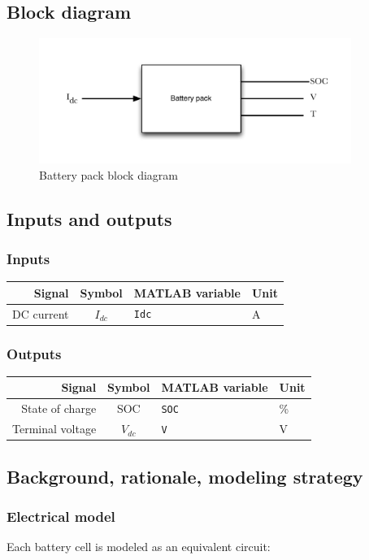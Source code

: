 \documentclass[../SimBALink.tex]{subfiles}
\begin{document}
\subsection{Block diagram}
		\begin{figure}[h!]
				\centering
				\includegraphics[width=4in]{Battery_pack_block_diagram}
				\caption{Battery pack block diagram}
		\end{figure}

\subsection{Inputs and outputs}
	\subsubsection{Inputs}
		\begin{tabular}{ r | c | l | l }
			Signal						&	Symbol		&	MATLAB variable	&	Unit						\\\hline
			DC current					&	$I_{dc}$		&	\texttt{Idc}		&	A		\\
		\end{tabular}
	
	\subsubsection{Outputs}
		\begin{tabular}{ r | c | l | l }
		Signal						&	Symbol				&	MATLAB variable	&	Unit						\\\hline
		State of charge				&	SOC					&	\texttt{SOC}		&	\%		\\
		Terminal voltage				&	$V_{dc}$				&	\texttt{V}			&	V		\\
	\end{tabular}
	
\subsection{Background, rationale, modeling strategy}
	\subsubsection{Electrical model}
		Each battery cell is modeled as an equivalent circuit:
		
\end{document}

